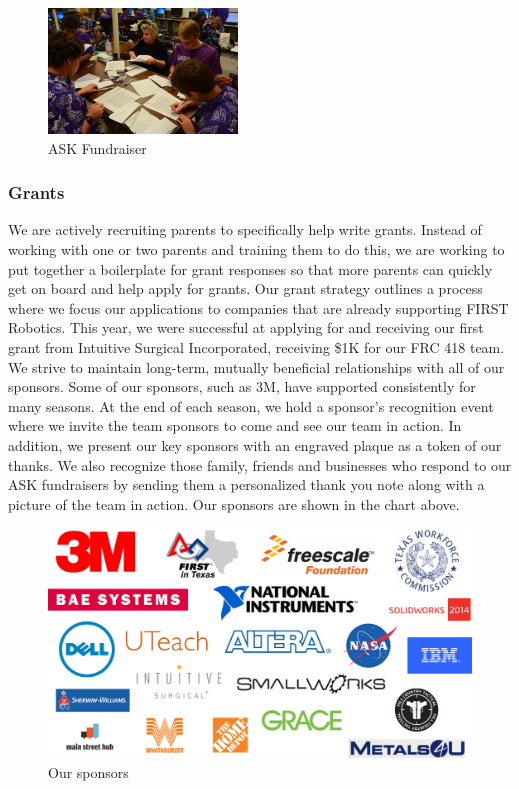 \begin{figure}
	\color{darkgray}
	\centering
	\includegraphics[height=0.3\linewidth]{ask}
	\caption[]{ASK Fundraiser}
	\label{fig:ask}
\end{figure}

\subsubsection{Grants}
We are actively recruiting parents to specifically help write grants.  Instead of working with one or two parents and training them to do this, we are working to put together a boilerplate for grant responses so that more parents can quickly get on board and help apply for grants.  Our grant strategy outlines a process where we focus our applications to companies that are already supporting FIRST Robotics.  This year, we were successful at applying for and receiving our first grant from Intuitive Surgical Incorporated, receiving \$1K for our FRC 418 team.\\

We strive to maintain long-term, mutually beneficial relationships with all of our sponsors. Some of our sponsors, such as 3M, have supported consistently for many seasons. At the end of each season, we hold a sponsor’s recognition event where we invite the team sponsors to come and see our team in action. In addition, we present our key sponsors with an engraved plaque as a token of our thanks. We also recognize those family, friends and businesses who respond to our ASK fundraisers by sending them a personalized thank you note along with a picture of the team in action.  
Our sponsors are shown in the chart above.

\begin{figure}
	\color{darkgray}
	\centering
	\includegraphics[height=0.3\linewidth]{sponsors}
	\caption[]{Our sponsors}
	\label{fig:sponsors}
\end{figure}

